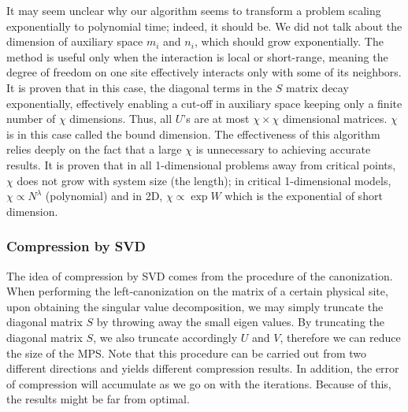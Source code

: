 \documentclass[english]{article}
\begin{document}
It may seem unclear why our algorithm seems to transform a
 problem scaling exponentially to polynomial time; indeed, it should be.
We did not talk about the dimension of auxiliary space $m_{i}$ and
$n_{i}$, which should grow exponentially. The method is useful
only when the interaction is local or short-range, meaning the
degree of freedom on one site  effectively interacts only with some
of its neighbors. It is proven that in this case, the diagonal terms
in the $S$ matrix decay exponentially, effectively enabling a cut-off
in auxiliary space keeping only a finite number of $\chi$ dimensions. Thus, all $U$'s are at most $\chi\times\chi$ dimensional matrices.
$\chi$ is in this case called the bound dimension. The effectiveness of this algorithm
relies deeply on the fact that a large $\chi$ is unnecessary to achieving accurate
results. It is proven that in all 1-dimensional problems away from critical
points, $\chi$ does not grow with system size (the length); in critical
1-dimensional models, $\chi\propto N^{\lambda}$ (polynomial) and
in 2D, $\chi\propto\exp W$ which is the exponential of short dimension.

\subsubsection{Compression by SVD}
The idea of compression by SVD comes from the procedure of the canonization. When performing the left-canonization on the matrix of a certain physical site, upon obtaining the singular value decomposition, we may simply truncate the diagonal matrix $S$ by throwing away the small eigen values. By truncating the diagonal matrix $S$, we also truncate accordingly $U$ and $V$, therefore we can reduce the size of the MPS. Note that this procedure can be carried out from two different directions and yields different compression results. In addition, the error of compression will accumulate as we go on with the iterations. Because of this, the results might be far from optimal.
\end{document}
